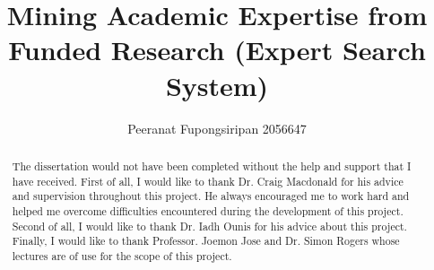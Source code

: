 \documentclass{l4proj}
\title{Mining Academic Expertise from Funded Research (Expert Search System)}
\author{Peeranat Fupongsiripan 2056647}
\begin{document}
\maketitle

\begin{abstract}

\end{abstract}


\renewcommand{\abstractname}{Acknowledgements}
\begin{abstract}
The dissertation would not have been completed without the help and support that I have received.
First of all, I would like to thank Dr. Craig Macdonald for his advice and supervision throughout this project. He always encouraged me to 
work hard and helped me overcome difficulties encountered during the development of this project. Second of all, I would like to thank 
Dr. Iadh Ounis for his advice about this project. Finally, I would like to thank Professor. Joemon Jose and Dr. Simon Rogers whose lectures are 
of use for the scope of this project.
\end{abstract}

\tableofcontents



















\clearpage



\begin{appendices}

\end{appendices}
\end{document}
